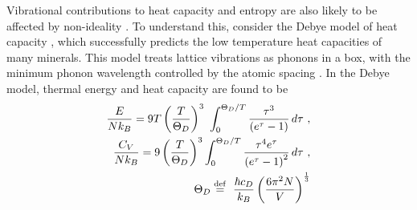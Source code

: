 Vibrational contributions to heat capacity and entropy are also likely to be affected by non-ideality \citep[e.g.][]{WC2002}. To understand this, consider the Debye model of heat capacity \citep{Debye1912}, which successfully predicts the low temperature heat capacities of many minerals. This model treats lattice vibrations as phonons in a box, with the minimum phonon wavelength controlled by the atomic spacing \citep{AM1976, Grimvall1999}. %
In the Debye model, thermal energy and heat capacity are found to be
\begin{eqnarray}
\frac{E}{Nk_B} = 9 T \left({T\over \Theta_D}\right)^3\ \int_0^{\Theta_D/T} {\tau^3 \over \left(e^\tau-1\right)}\, d\tau\ ,\\
\frac{C_V}{Nk_B} = 9 \left({T\over \Theta_D}\right)^3\int_0^{\Theta_D/T} {\tau^4 e^\tau\over\left(e^\tau-1\right)^2}\, d\tau\ ,\\
\Theta_D \stackrel{\mathrm{def}}{=}\  {\hbar c_D \over k_B} \left( {6 \pi^2 N \over V} \right)^{1\over3} \label{debye}
\end{eqnarray}
